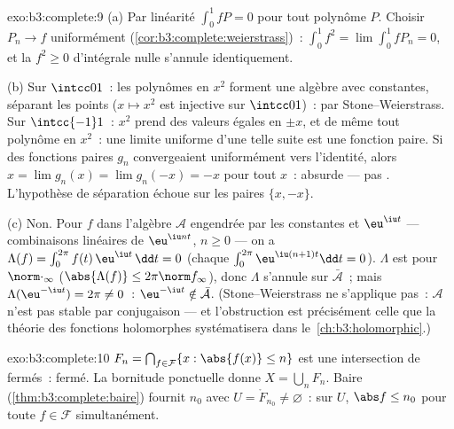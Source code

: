 \begin{solution}{exo:b3:complete:9}
(a) Par linéarité $\int_0^1 fP = 0$ pour tout polynôme $P$.
Choisir $P_n \to f$ uniformément
(\cref{cor:b3:complete:weierstrass})~: $\int_0^1 f^2 =
\lim\int_0^1 fP_n = 0$, et la  $f^2 \geq 0$
d'intégrale nulle s'annule identiquement.

(b) Sur $\intcc01$~: les polynômes en $x^2$ forment une
algèbre avec constantes, séparant les points ($x \mapsto x^2$
est injective sur $\intcc01$)~:  par Stone--Weierstrass.
Sur $\intcc{-1}1$~: $x^2$ prend des valeurs égales en $\pm
x$, et de même tout polynôme en $x^2$~: une limite uniforme
d'une telle suite est une fonction paire. Si des fonctions
paires $g_n$ convergeaient uniformément vers l'identité, alors
$x = \lim g_n(x) = \lim g_n(-x) = -x$ pour tout $x$~:
absurde --- pas . L'hypothèse de séparation échoue sur
les paires $\{x, -x\}$.

(c) Non. Pour $f$ dans l'algèbre $\mathcal A$ engendrée par
les constantes et $\eu^{\iu t}$ --- combinaisons linéaires de
$\eu^{\iu nt}$, $n \geq 0$ --- on a $\Lambda(f) =
\int_0^{2\pi}f(t)\,\eu^{\iu t}\,\dd t = 0$ (chaque
$\int_0^{2\pi}\eu^{\iu(n+1)t}\dd t = 0$). $\Lambda$ est
 pour $\norm\cdot_\infty$ ($\abs{\Lambda(f)}\leq
2\pi\norm f_\infty$), donc $\Lambda$ s'annule sur
$\bar{\mathcal A}$~; mais $\Lambda(\eu^{-\iu t}) = 2\pi \neq
0$~: $\eu^{-\iu t} \notin \bar{\mathcal A}$.
(Stone--Weierstrass ne s'applique pas~: $\mathcal A$ n'est
pas stable par conjugaison --- et l'obstruction est
précisément celle que la théorie des fonctions holomorphes
systématisera dans le~\cref{ch:b3:holomorphic}.)
\end{solution}

\begin{solution}{exo:b3:complete:10}
$F_n = \bigcap_{f \in \mathcal F}\{x : \abs{f(x)} \leq n\}$
est une intersection de fermés~: fermé. La bornitude
ponctuelle donne $X = \bigcup_n F_n$. Baire
(\cref{thm:b3:complete:baire}) fournit $n_0$ avec $U =
\mathring F_{n_0} \neq \varnothing$~: sur $U$, $\abs f \leq
n_0$ pour toute $f \in \mathcal F$ simultanément.
\end{solution}

